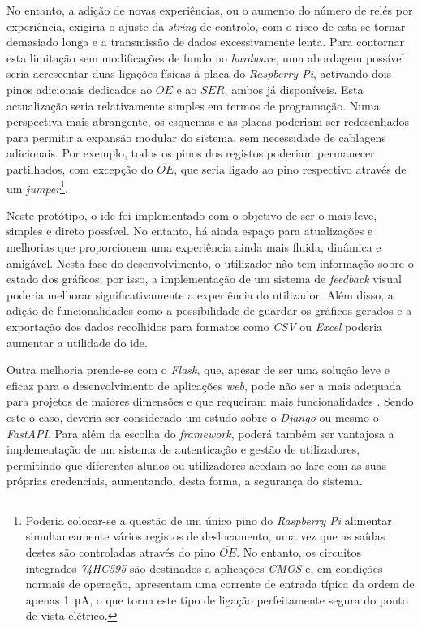 No entanto, a adição de novas experiências, ou o aumento do número de relés por experiência, exigiria o ajuste da \textit{string} de controlo, com o risco de esta se tornar demasiado longa e a transmissão de dados excessivamente lenta. Para contornar esta limitação sem modificações de fundo no \textit{hardware}, uma abordagem possível seria acrescentar duas ligações físicas à placa do \textit{Raspberry Pi}, activando dois pinos adicionais dedicados ao $\overline{OE}$ e ao $SER$, ambos já disponíveis. Esta actualização seria relativamente simples em termos de programação. Numa perspectiva mais abrangente, os esquemas e as placas poderiam ser redesenhados para permitir a expansão modular do sistema, sem necessidade de cablagens adicionais. Por exemplo, todos os pinos dos registos poderiam permanecer partilhados, com excepção do $\overline{OE}$, que seria ligado ao pino respectivo através de um \textit{jumper}\footnote{Poderia colocar-se a questão de um único pino do \textit{Raspberry Pi} alimentar simultaneamente vários registos de deslocamento, uma vez que as saídas destes são controladas através do pino $\overline{OE}$. No entanto, os circuitos integrados \textit{74HC595} são destinados a aplicações \textit{CMOS} e, em condições normais de operação, apresentam uma corrente de entrada típica da ordem de apenas \SI{1}{\micro\ampere}\cite{SN74HC595}, o que torna este tipo de ligação perfeitamente segura do ponto de vista elétrico.}. 

Neste protótipo, o \acrshort{ide} foi implementado com o objetivo de ser o mais leve, simples e direto possível. No entanto, há ainda espaço para atualizações e melhorias que proporcionem uma experiência ainda mais fluida, dinâmica e amigável. Nesta fase do desenvolvimento, o utilizador não tem informação sobre o estado dos gráficos; por isso, a implementação de um sistema de \textit{feedback} visual poderia melhorar significativamente a experiência do utilizador. Além disso, a adição de funcionalidades como a possibilidade de guardar os gráficos gerados e a exportação dos dados recolhidos para formatos como \textit{CSV} ou \textit{Excel} poderia aumentar a utilidade do \acrshort{ide}.

Outra melhoria prende-se com o \textit{Flask}, que, apesar de ser uma solução leve e eficaz para o desenvolvimento de aplicações \textit{web}, pode não ser a mais adequada para projetos de maiores dimensões e que requeiram mais funcionalidades \cite{FlaskvsDjango, Djangovsflask}. Sendo este o caso, deveria ser considerado um estudo sobre o \textit{Django} ou mesmo o \textit{FastAPI}. Para além da escolha do \textit{framework}, poderá também ser vantajosa a implementação de um sistema de autenticação e gestão de utilizadores, permitindo que diferentes alunos ou utilizadores acedam ao \acrshort{lare} com as suas próprias credenciais, aumentando, desta forma, a segurança do sistema.
